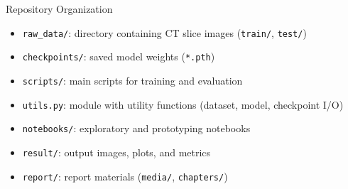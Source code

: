 

\begin{frame}{Repository Organization}
  \begin{itemize}
    \item \texttt{raw\_data/}: directory containing CT slice images (\texttt{train/}, \texttt{test/})
    \item \texttt{checkpoints/}: saved model weights (\texttt{*.pth})
    \item \texttt{scripts/}: main scripts for training and evaluation
    \item \texttt{utils.py}: module with utility functions (dataset, model, checkpoint I/O)
    \item \texttt{notebooks/}: exploratory and prototyping notebooks
    \item \texttt{result/}: output images, plots, and metrics
    \item \texttt{report/}: report materials (\texttt{media/}, \texttt{chapters/})
  \end{itemize}
\end{frame}

